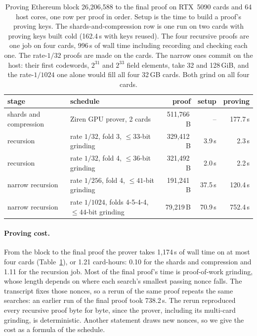 \documentclass[11pt]{article}
\begin{document}
\begin{table}[t]\centering\small\setlength{\tabcolsep}{4pt}
\begin{tabular}{llrrr}\toprule
stage & schedule & proof & setup & proving\\\midrule
shards and compression & Ziren GPU prover, 2 cards & 511{,}766\,B & -- & 177.7\,s\\
recursion & rate $1/32$, fold 3, $\le33$-bit grinding & 329{,}412\,B & 3.9\,s & 2.3\,s\\
recursion & rate $1/32$, fold 4, $\le36$-bit grinding & 321{,}492\,B & 2.0\,s & 2.2\,s\\
narrow recursion & rate $1/256$, fold 4, $\le41$-bit grinding & 191{,}241\,B & 37.5\,s & 120.4\,s\\
narrow recursion & rate $1/1024$, folds 4-5-4-4, $\le44$-bit grinding & 79{,}219\,B & 70.9\,s & 752.4\,s\\\bottomrule
\end{tabular}
\caption{Proving Ethereum block 26{,}206{,}588 to the final proof on RTX~5090 cards and 64 host cores, one row per proof in order. Setup is the time to build a proof's proving keys. The shards-and-compression row is one run on two cards
with proving keys built cold (162.4\,s with keys reused). The four recursive
proofs are one job on four cards, 996\,s of wall time including recording
and checking each one. The rate-$1/32$ proofs are made on the cards. The
narrow ones commit on the host: their first codewords, $2^{31}$ and $2^{33}$
field elements, take 32 and 128\,GiB, and the rate-$1/1024$ one alone would
fill all four 32\,GB cards. Both grind on all four cards.}
\label{tab:proving}
\end{table}

\paragraph{Proving cost.} From the block to the final proof the prover takes
1{,}174\,s of wall time on at most four cards (Table~\ref{tab:proving}), or
1.21 card-hours: 0.10 for the shards and compression and 1.11 for the
recursion job. Most of the final proof's time is proof-of-work grinding, whose
length depends on where each search's smallest passing nonce falls. The
transcript fixes those nonces, so a rerun of the same proof repeats the same
searches: an earlier run of the final proof took 738.2\,s. The rerun
reproduced every recursive proof byte for byte, since the prover, including
its multi-card grinding, is deterministic. Another statement draws new
nonces, so we give the cost as a formula of the schedule.
\end{document}
